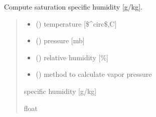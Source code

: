 \documentclass[letterpaper,10pt,english]{sphinxmanual}
\begin{document}

\begin{fulllineitems}
\label{\detokenize{users_guide:AirSeaFluxCode.hum_subs.qsat_air}}
\pysigstartsignatures
{}
\pysigstopsignatures
\sphinxAtStartPar
Compute saturation specific humidity {[}g/kg{]}.
\begin{quote}\begin{description}
\begin{itemize}
\item {} 
\sphinxAtStartPar
{} () \textendash{} temperature {[}\$\textasciicircum{}circ\$,C{]}

\item {} 
\sphinxAtStartPar
{} () \textendash{} pressure {[}mb{]}

\item {} 
\sphinxAtStartPar
{} () \textendash{} relative humidity {[}\%{]}

\item {} 
\sphinxAtStartPar
{} () \textendash{} method to calculate vapor pressure

\end{itemize}

\sphinxAtStartPar
{} \textendash{} specific humidity {[}g/kg{]}

\sphinxAtStartPar
float

\end{description}\end{quote}

\end{fulllineitems}

\end{document}

